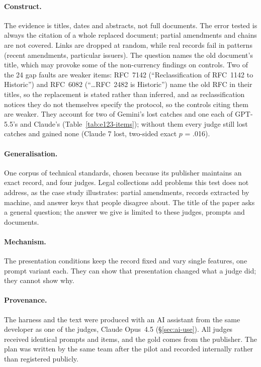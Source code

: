\paragraph{Construct.} The evidence is titles, dates and abstracts, not full documents. The error tested is always the
citation of a whole replaced document; partial amendments and chains are not covered. Links are dropped at random,
while real records fail in patterns (recent amendments, particular issuers). The question names the old document's
title, which may provoke some of the non-currency findings on controls. Two of the 24 gap faults are weaker items:
RFC~7142 (``Reclassification of RFC~1142 to Historic'') and RFC~6082 (``\ldots RFC~2482 is Historic'') name the
old RFC in their titles, so the replacement is stated rather than inferred, and as reclassification notices they do
not themselves specify the protocol, so the controls citing them are weaker. They account for two of Gemini's lost
catches and one each of GPT-5.5's and Claude's (Table~\ref{tab:e123-items}); without them every judge still lost
catches and gained none (Claude 7 lost, two-sided exact $p$ = .016).

\paragraph{Generalisation.} One corpus of technical standards, chosen because its publisher maintains an exact
record, and four judges. Legal collections add problems this test does not address, as the case study illustrates:
partial amendments, records extracted by machine, and answer keys that people disagree about. The title of the paper
asks a general question; the answer we give is limited to these judges, prompts and documents.

\paragraph{Mechanism.} The presentation conditions keep the record fixed and vary single features, one prompt variant
each. They can show that presentation changed what a judge did; they cannot show why.

\paragraph{Provenance.} The harness and the text were produced with an AI assistant from the same developer as one of
the judges, Claude Opus~4.5 (\S\ref{sec:ai-use}). All judges received identical prompts and items, and the gold comes
from the publisher. The plan was written by the same team after the pilot and recorded internally rather than
registered publicly.
